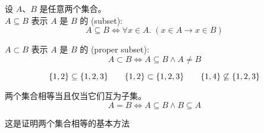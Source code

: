 \begin{frame}{}
  \begin{definition}[子集]
    设 $A$、$B$ 是任意两个集合。\\[8pt]

    $A \subseteq B$ 表示 $A$ 是 $B$ 的 (subset):
    \[
      A \subseteq B \iff \forall x \in A.\; (x \in A \to x \in B)
    \]

    $A \subset B$ 表示 $A$ 是 $B$ 的 (proper subset):
    \[
      A \subset B \iff A \subseteq B \land A \neq B
    \]
  \end{definition}

  \[
    \{1, 2\} \subseteq \{1, 2, 3\}
    \qquad \{1, 2\} \subset \{1, 2, 3\}
    \qquad \{1, 4\} \not\subseteq \{1, 2, 3\}
  \]
\end{frame}

\begin{frame}{}
  \begin{theorem}
    两个集合相等当且仅当它们互为子集。
    \[
      A = B \iff A \subseteq B \land B \subseteq A
    \]
  \end{theorem}

  \vspace{0.30cm}
  \begin{center}
    这是证明两个集合相等的基本方法
  \end{center}
\end{frame}
